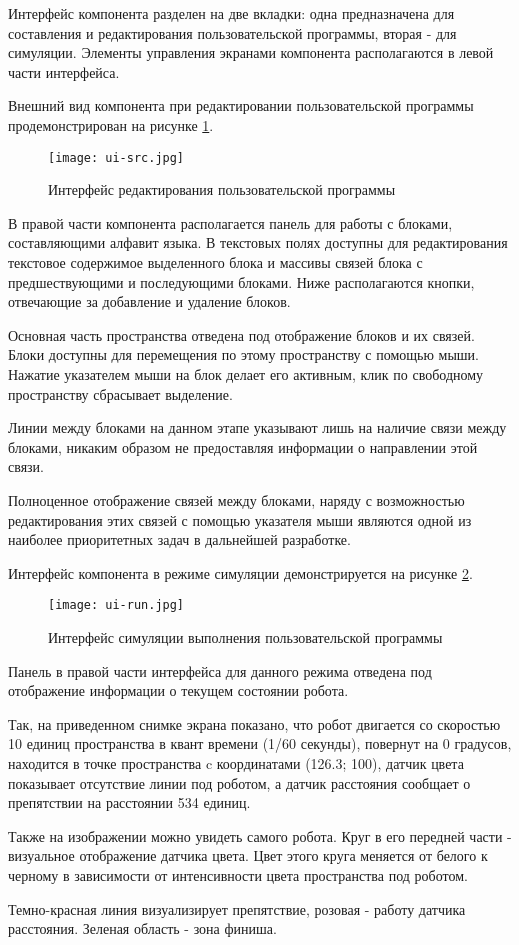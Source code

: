 Интерфейс компонента разделен на две вкладки: одна предназначена для составления и редактирования пользовательской программы, вторая - для симуляции. Элементы управления экранами компонента располагаются в левой части интерфейса.

Внешний вид компонента при редактировании пользовательской программы продемонстрирован на рисунке \ref{fig:ui-src}.

\begin{figure}[htbp]
	\centering
	\texttt{[image: ui-src.jpg]}
	\caption{Интерфейс редактирования пользовательской программы}%
	\label{fig:ui-src}
\end{figure}

В правой части компонента располагается панель для работы с блоками, составляющими алфавит языка. В текстовых полях доступны для редактирования текстовое содержимое выделенного блока и массивы связей блока с предшествующими и последующими блоками. Ниже располагаются кнопки, отвечающие за добавление и удаление блоков.

Основная часть пространства отведена под отображение блоков и их связей. Блоки доступны для перемещения по этому пространству с помощью мыши. Нажатие указателем мыши на блок делает его активным, клик по свободному пространству сбрасывает выделение.

Линии между блоками на данном этапе указывают лишь на наличие связи между блоками, никаким образом не предоставляя информации о направлении этой связи. 

Полноценное отображение связей между блоками, наряду с возможностью редактирования этих связей с помощью указателя мыши являются одной из наиболее приоритетных задач в дальнейшей разработке.

Интерфейс компонента в режиме симуляции демонстрируется на рисунке \ref{fig:ui-run}.

\begin{figure}[htbp]
	\centering
	\texttt{[image: ui-run.jpg]}
	\caption{Интерфейс симуляции выполнения пользовательской программы}%
	\label{fig:ui-run}
\end{figure}

Панель в правой части интерфейса для данного режима отведена под отображение информации о текущем состоянии робота.

Так, на приведенном снимке экрана показано, что робот двигается со скоростью 10 единиц пространства в квант времени (1/60 секунды), повернут на 0 градусов, находится в точке пространства c координатами (126.3; 100), датчик цвета показывает отсутствие линии под роботом, а датчик расстояния сообщает о препятствии на расстоянии 534 единиц.

Также на изображении можно увидеть самого робота. Круг в его передней части - визуальное отображение датчика цвета. Цвет этого круга меняется от белого к черному в зависимости от интенсивности цвета пространства под роботом.

Темно-красная линия визуализирует препятствие, розовая - работу датчика расстояния. Зеленая область - зона финиша.

